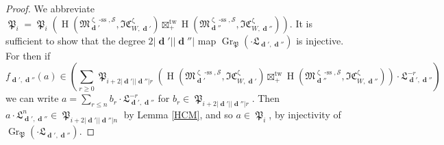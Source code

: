 \documentclass[a4paper,10pt]{amsart}
\renewcommand{\zeta}{\upzeta}
\DeclareMathOperator{\Pf}{\mathfrak{P}}
\newcommand{\SP}{\mathcal{S}}
\newcommand{\Mst}{\mathfrak{M}}
\newcommand{\ICSt}{\mathfrak{IC}}
\DeclareMathOperator{\sst}{-ss}
\DeclareMathOperator{\tw}{tw}
\DeclareMathOperator{\Gr}{Gr}
\DeclareMathOperator{\dd}{\mathbf{d}}
\DeclareMathOperator{\HO}{H}
\begin{document}
\begin{proof}
We abbreviate $\Pf_i=\Pf_i\left(\HO(\Mst^{\zeta\sst,\SP}_{\dd'},\ICSt_{W,\dd'}^{\zeta})\boxtimes_+^{\tw} \HO(\Mst^{\zeta\sst,\SP}_{\dd''},\ICSt_{W,\dd''}^{\zeta})\right)$.  It is sufficient to show that the degree $2\lvert\dd'\rvert \lvert\dd''\rvert$ map $\Gr_{\Pf}(\cdot \mathfrak{L}_{\dd',\dd''})$ is injective.  For then if 
\[
f_{\dd',\dd''}(a)\in \left(\sum_{r\geq 0}\Pf_{i+2\lvert\dd'\rvert \lvert\dd''\rvert r}\left(\HO(\Mst^{\zeta\sst,\SP}_{\dd'},\ICSt_{W,\dd'}^{\zeta})\boxtimes_+^{\tw} \HO(\Mst^{\zeta\sst,\SP}_{\dd''},\ICSt_{W,\dd''}^{\zeta})\right)\cdot \mathfrak{L}_{\dd',\dd''}^{-r}\right)
\]
we can write $a=\sum_{r\leq n} b_r\cdot\mathfrak{L}^{-r}_{\dd',\dd''}$ for $b_r\in \Pf_{i+2\lvert\dd'\rvert \lvert\dd''\rvert r}$.  Then $a\cdot \mathfrak{L}^n_{\dd',\dd''}\in\Pf_{i+2\lvert\dd'\rvert \lvert\dd''\rvert n}$ by Lemma \ref{HCM}, and so $a\in \Pf_{i}$, by injectivity of $\Gr_{\Pf}(\cdot \mathfrak{L}_{\dd',\dd''})$.


\end{proof}
\end{document}
